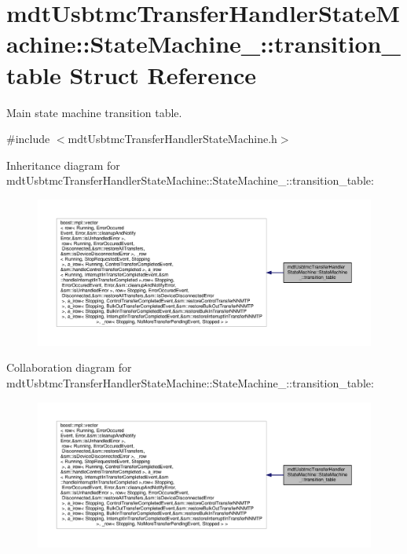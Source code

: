 \hypertarget{structmdt_usbtmc_transfer_handler_state_machine_1_1_state_machine___1_1transition__table}{\section{mdt\-Usbtmc\-Transfer\-Handler\-State\-Machine\-:\-:State\-Machine\-\_\-\-:\-:transition\-\_\-table Struct Reference}
\label{structmdt_usbtmc_transfer_handler_state_machine_1_1_state_machine___1_1transition__table}
}


Main state machine transition table.  




{\ttfamily \#include $<$mdt\-Usbtmc\-Transfer\-Handler\-State\-Machine.\-h$>$}



Inheritance diagram for mdt\-Usbtmc\-Transfer\-Handler\-State\-Machine\-:\-:State\-Machine\-\_\-\-:\-:transition\-\_\-table\-:\nopagebreak
\begin{figure}[H]
\begin{center}
\leavevmode
\includegraphics[width=350pt]{structmdt_usbtmc_transfer_handler_state_machine_1_1_state_machine___1_1transition__table__inherit__graph}
\end{center}
\end{figure}


Collaboration diagram for mdt\-Usbtmc\-Transfer\-Handler\-State\-Machine\-:\-:State\-Machine\-\_\-\-:\-:transition\-\_\-table\-:\nopagebreak
\begin{figure}[H]
\begin{center}
\leavevmode
\includegraphics[width=350pt]{structmdt_usbtmc_transfer_handler_state_machine_1_1_state_machine___1_1transition__table__coll__graph}
\end{center}
\end{figure}


